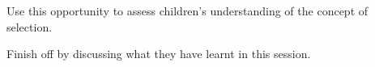 \documentclass{../../../lessonplan}
\begin{document}
\begin{lessonplan}


Use this opportunity to assess children's understanding of the concept of selection.

Finish off by discussing what they have learnt in this session.


\end{lessonplan}
\end{document}

